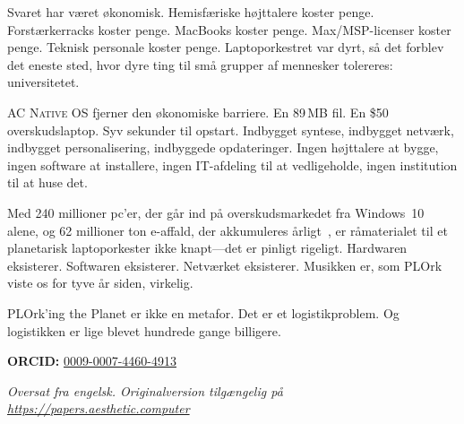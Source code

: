 \documentclass[10pt,letterpaper,twocolumn]{article}
\newcommand{\acos}{\textsc{AC Native OS}}
\begin{document}
Svaret har v{\ae}ret {\o}konomisk. Hemisf{\ae}riske h{\o}jttalere koster penge. Forst{\ae}rkerracks koster penge. MacBooks koster penge. Max/MSP-licenser koster penge. Teknisk personale koster penge. Laptoporkestret var dyrt, s{\aa} det forblev det eneste sted, hvor dyre ting til sm{\aa} grupper af mennesker tolereres: universitetet.

\acos{} fjerner den {\o}konomiske barriere. En 89\,MB fil. En \$50 overskudslaptop. Syv sekunder til opstart. Indbygget syntese, indbygget netv{\ae}rk, indbygget personalisering, indbyggede opdateringer. Ingen h{\o}jttalere at bygge, ingen software at installere, ingen IT-afdeling til at vedligeholde, ingen institution til at huse det.

Med 240 millioner pc'er, der g{\aa}r ind p{\aa} overskudsmarkedet fra Windows~10 alene, og 62 millioner ton e-affald, der akkumuleres {\aa}rligt~\citep{forti2024ewaste}, er r{\aa}materialet til et planetarisk laptoporkester ikke knapt---det er pinligt rigeligt. Hardwaren eksisterer. Softwaren eksisterer. Netv{\ae}rket eksisterer. Musikken er, som PLOrk viste os for tyve {\aa}r siden, virkelig.

PLOrk'ing the Planet er ikke en metafor. Det er et logistikproblem. Og logistikken er lige blevet hundrede gange billigere.

\vspace{0.5em}
\noindent\textbf{ORCID:} \href{https://orcid.org/0009-0007-4460-4913}{0009-0007-4460-4913}

\vspace{0.5em}
\noindent\textit{Oversat fra engelsk. Originalversion tilg{\ae}ngelig p{\aa} \url{https://papers.aesthetic.computer}}




\end{document}
